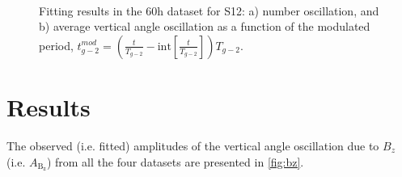 \documentclass[12pt]{article}
\begin{document}
\begin{figure}[htpb]
    \centering
     \\ 
    \vspace{-0.2cm}
    \caption{Fitting results in the 60h dataset for S12: a) number oscillation, and b) average vertical angle oscillation as a function of the modulated period, $t^{mod}_{g-2} = (\frac{t}{T_{g-2}} - \mathrm{int}[\frac{t}{T_{g-2}}])T_{g-2}$.}
    \label{fig:s12_bz}
\end{figure}


\clearpage
\thispagestyle{plain}
\section{Results}
The observed (i.e. fitted) amplitudes of the vertical angle oscillation due to $B_z$ (i.e. $A_{\mathrm{B_z}}$) from all the four  datasets are presented in \cref{fig:bz}.
\end{document}
